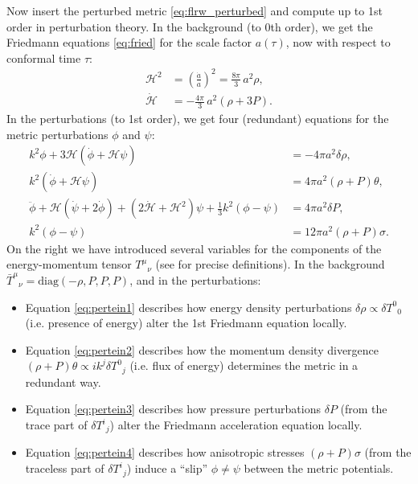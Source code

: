 \documentclass[USenglish, thumbmarks]{uiophdthesis} %
\newcommand\calH{\mathcal{H}}
\begin{document}
Now insert the perturbed metric \eqref{eq:flrw_perturbed}
and compute up to 1st order in perturbation theory.
In the background (to 0th order),
we get the Friedmann equations \eqref{eq:fried} for the scale factor $a(\tau)$,
now with respect to conformal time $\tau$:%
\begin{subequations}
\begin{align}
\calH^2 &= \left( \frac{\dot{a}}{a} \right)^2 = \frac{8\pi}{3} \, a^2 \rho , \label{eq:bgfried1} \\
\dot{\calH} &= -\frac{4\pi}{3} \, a^2 (\rho+3P) \label{eq:bgfried2}.
\end{align}
\end{subequations}
In the perturbations (to 1st order),
we get four (redundant) equations for the metric perturbations $\phi$ and $\psi$:
\begin{subequations}
\label{eq:pertein}
\begin{align}
k^2 \phi + 3\calH(\dot{\phi} + \calH \psi) &= -4\pi a^2 \delta\rho, \label{eq:pertein1} \\
k^2 (\dot\phi + \calH \psi) &= 4\pi a^2 (\rho+P)\theta, \label{eq:pertein2} \\
\ddot{\phi} + \calH (\dot{\psi}+2\dot{\phi}) + (2\dot{\calH}+\calH^2) \psi + \tfrac13 k^2 (\phi-\psi) &= 4\pi a^2 \delta P , \label{eq:pertein3} \\
k^2 (\phi-\psi) &= 12 \pi a^2 (\rho+P)\sigma. \label{eq:pertein4}
\end{align}
\end{subequations}
On the right we have introduced several variables for the components of the energy-momentum tensor $T^\mu{}_\nu$
(see \cite{maCosmologicalPerturbationTheory1995a} for precise definitions).
In the background $\bar{T}^\mu{}_\nu = \mathrm{diag}(-\rho, P, P, P)$,
and in the perturbations:%
\begin{itemize}
\item Equation \eqref{eq:pertein1} describes how energy density perturbations $\delta\rho \propto \delta T^0{}_0$ (i.e. presence of energy) alter the 1st Friedmann equation locally.
\item Equation \eqref{eq:pertein2} describes how the momentum density divergence $(\rho+P)\theta \propto i k^j \delta T^0{}_j$ (i.e. flux of energy) determines the metric in a redundant way.
\item Equation \eqref{eq:pertein3} describes how pressure perturbations $\delta P$ (from the trace part of $\delta T^i{}_j$) alter the Friedmann acceleration equation locally.
\item Equation \eqref{eq:pertein4} describes how anisotropic stresses $(\rho+P)\sigma$ (from the traceless part of $\delta T^i{}_j$) induce a \enquote{slip} $\phi \neq \psi$ between the metric potentials.
\end{itemize}
\end{document}
